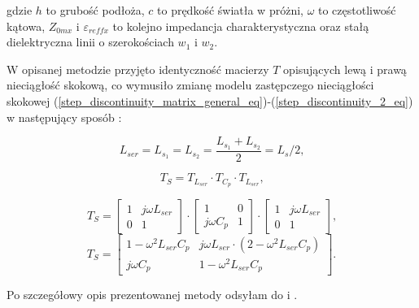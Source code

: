  \noindent gdzie $h$ to grubość podłoża, $c$ to prędkość światła w próżni, $\omega$ to częstotliwość kątowa, $Z_{0mx}$ i $\varepsilon_{reffx}$ to kolejno impedancja charakterystyczna oraz stałą dielektryczna linii o szerokościach $w_1$ i $w_2$.
 \par W opisanej metodzie przyjęto identyczność macierzy $T$ opisujących lewą i prawą nieciągłość skokową, co wymusiło zmianę modelu zastępczego nieciągłości skokowej (\ref{step_discontinuity_matrix_general_eq})-(\ref{step_discontinuity_2_eq}) w następujący sposób \cite{cite:line_width_method}:

 \begin{equation}
    \label{step_discontinuity_7_eq}
      L_{ser} = L_{s_1} = L_{s_2} = \frac{L_{s_1} + L_{s_2}}{2} = L_{s}/2 \text{,}
 \end{equation}

  \begin{equation}
    \label{step_discontinuity_matrix_general-modified_eq}
      T_{S} = T_{L_{ser}} \cdot T_{C_p} \cdot T_{L_{ser}} \text{,}
 \end{equation}

 \begin{equation}
    \label{step_discontinuity_matrix_modified_eq}
      T_{S} = \begin{bmatrix} 1 & j\omega L_{ser} \\ 0 & 1 \end{bmatrix} \cdot \begin{bmatrix} 1 & 0 \\ j\omega C_p & 1 \end{bmatrix}
      \cdot \begin{bmatrix} 1 & j\omega L_{ser} \\ 0 & 1 \end{bmatrix} \text{,}
 \end{equation}
\begin{equation}
    \label{step_discontinuity_matrix_modified_2_eq}
      T_{S} =  \begin{bmatrix}
      1 - \omega^2 L_{ser}C_{p} &j\omega L_{ser} \cdot \left( 2 - \omega^{2} L_{ser} C_{p} \right) \\ 
      j\omega C_p & 1 - \omega^2 L_{ser} C_{p} \end{bmatrix} \text{.}
 \end{equation}

\noindent Po szczegółowy opis prezentowanej metody odsyłam do \cite{cite:line_width_method} i \cite{cite:doktorat}.

